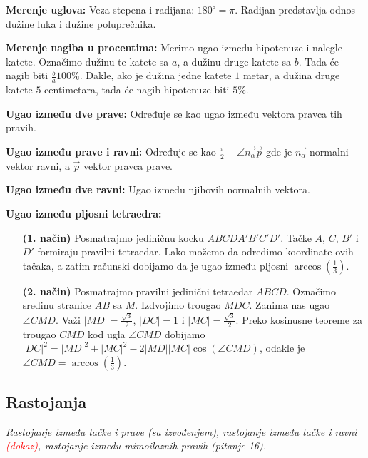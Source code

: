 \documentclass[12pt]{article}
\newcommand{\vek}[1]{\overrightarrow{#1}}
\newcommand{\ocena}[1]{\textcolor{red}{#1}}
\begin{document}
\textbf{Merenje uglova:} Veza stepena i radijana: $180^\circ=\pi$. Radijan
predstavlja odnos dužine luka i dužine poluprečnika.
\par

\textbf{Merenje nagiba u procentima:} Merimo ugao između hipotenuze i
nalegle katete. Označimo dužinu te katete sa $a$, a dužinu druge katete
sa $b$. Tada će nagib biti $\frac{b}{a}100\%$.
Dakle, ako je dužina jedne katete $1$ metar, a dužina druge katete $5$
centimetara, tada će nagib hipotenuze biti $5\%$.
\par

\textbf{Ugao između dve prave:} Određuje se kao ugao između vektora pravca tih
pravih.
\par

\textbf{Ugao između prave i ravni:} Određuje se kao
$\frac{\pi}{2}-\angle{\vek{n_\alpha}\vek{p}}$ gde je $\vek{n_\alpha}$ normalni
vektor ravni, a $\vek{p}$ vektor pravca prave.
\par

\textbf{Ugao između dve ravni:} Ugao između njihovih normalnih vektora.
\par

\textbf{Ugao između pljosni tetraedra:}
\begin{enumerate}[label=\textbf{(\arabic*)}]
    \item[\textbf{(1. način)}] Posmatrajmo jediničnu kocku $ABCDA'B'C'D'$. Tačke $A$, $C$, $B'$ i
          $D'$ formiraju pravilni tetraedar. Lako možemo da odredimo
          koordinate ovih tačaka, a zatim računski dobijamo da je ugao
          između pljosni $\arccos(\frac{1}{3})$.
    \item[\textbf{(2. način)}] Posmatrajmo pravilni jedinični tetraedar $ABCD$. Označimo sredinu
          stranice $AB$ sa $M$. Izdvojimo trougao $MDC$. Zanima nas ugao
          $\angle CMD$. Važi $|MD|=\frac{\sqrt{3}}{2}$, $|DC|=1$ i
          $|MC|=\frac{\sqrt{3}}{2}$. Preko kosinusne teoreme za trougao $CMD$
          kod ugla $\angle CMD$ dobijamo
          $|DC|^2=|MD|^2+|MC|^2-2|MD||MC|\cos(\angle CMD)$, odakle je
          $\angle CMD=\arccos(\frac{1}{3})$.
\end{enumerate}

\subsection{Rastojanja}
\textit{Rastojanje između tačke i prave (sa izvođenjem), rastojanje između
    tačke i ravni \ocena{(dokaz)}, rastojanje između mimoilaznih pravih (pitanje 16).}
\par
\vspace*{1cm}
\end{document}
